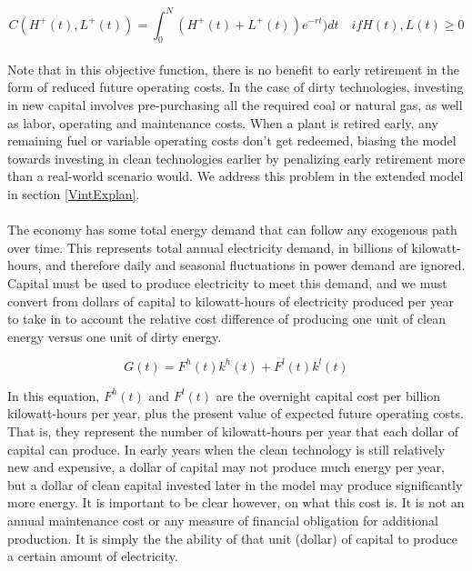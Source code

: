 \documentclass{article}
\begin{document}
\begin{equation}\label{eq:simpleObjective}
C(H^+(t), L^+(t)) = \int_0^N (H^+(t) + L^+(t))e^{-rt}) dt \quad if H(t), L(t) \geq 0
\end{equation}



\paragraph{} Note that in this objective function, there is no benefit to early retirement in the form of reduced future operating costs. In the case of dirty technologies, investing in new capital involves pre-purchasing all the required coal or natural gas, as well as labor, operating and maintenance costs. When a plant is retired early, any remaining fuel or variable operating costs don't get redeemed, biasing the model towards investing in clean technologies earlier by penalizing early retirement more than a real-world scenario would. We address this problem in the extended model in section \ref{VintExplan}.


\paragraph{} The economy has some total energy demand that can follow any exogenous path over time. This represents total annual electricity demand, in billions of kilowatt-hours, and therefore daily and seasonal fluctuations in power demand are ignored. Capital must be used to produce electricity to meet this demand, and we must convert from dollars of capital to kilowatt-hours of electricity produced per year to take in to account the relative cost difference of producing one unit of clean energy versus one unit of dirty energy. 

\begin{equation}\label{eq:simpleGenConstraint}
G(t) = F^h(t) k^h(t) + F^l(t) k^l(t)
\end{equation}

In this equation, $F^h (t)$ and $F^l (t)$ are the overnight capital cost per billion kilowatt-hours per year, plus the present value of expected future operating costs. That is, they represent the number of kilowatt-hours per year that each dollar of capital can produce. In early years when the clean technology is still relatively new and expensive, a dollar of capital may not produce much energy per year, but a dollar of clean capital invested later in the model may produce significantly more energy. It is important to be clear however, on what this cost is. It is not an annual maintenance cost or any measure of financial obligation for additional production. It is simply the the ability of that unit (dollar) of capital to produce a certain amount of electricity. 
\end{document}
